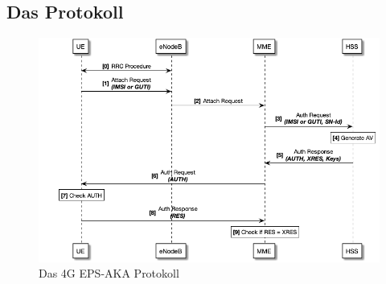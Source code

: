 \subsection{Das Protokoll}

\begin{figure}[H]
  \centering
  \includegraphics[width=\textwidth]{uml/4g-protocol_v1.png}
  \caption{Das 4G EPS-AKA Protokoll}
  \label{fig:4g_protocol_v1}
\end{figure} %

